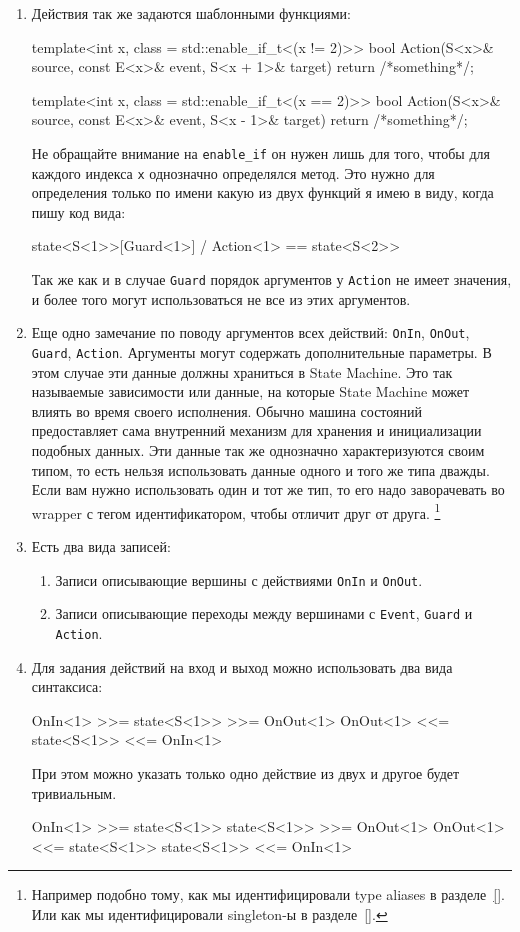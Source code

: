 \documentclass{article}
\begin{document}
{\begin{enumerate}
\item Действия так же задаются шаблонными функциями:
\begin{cppcode}[\nonumbers]
template<int x, class = std::enable_if_t<(x != 2)>>
bool Action(S<x>& source, const E<x>& event, S<x + 1>& target) {
  return /*something*/;
}

template<int x, class = std::enable_if_t<(x == 2)>>
bool Action(S<x>& source, const E<x>& event, S<x - 1>& target) {
  return /*something*/;
}
\end{cppcode}
Не обращайте внимание на \verb"enable_if" он нужен лишь для того, чтобы для каждого индекса \verb"x" однозначно определялся метод.
Это нужно для определения только по имени какую из двух функций я имею в виду, когда пишу код вида:
\begin{cppcode}[\nonumbers]
state<S<1>>[Guard<1>] / Action<1> == state<S<2>>
\end{cppcode}
Так же как и в случае \verb"Guard" порядок аргументов у \verb"Action" не имеет значения, и более того могут использоваться не все из этих аргументов.

\item Еще одно замечание по поводу аргументов всех действий: \verb"OnIn", \verb"OnOut", \verb"Guard", \verb"Action".
Аргументы могут содержать дополнительные параметры.
В этом случае эти данные должны храниться в State Machine.
Это так называемые зависимости или данные, на которые State Machine может влиять во время своего исполнения.
Обычно машина состояний предоставляет сама внутренний механизм для хранения и инициализации подобных данных.
Эти данные так же однозначно характеризуются своим типом, то есть нельзя использовать данные одного и того же типа дважды.
Если вам нужно использовать один и тот же тип, то его надо заворачевать во wrapper с тегом идентификатором, чтобы отличит друг от друга.%
\footnote{Например подобно тому, как мы идентифицировали  type aliases в разделе~\ref{}.
Или как мы идентифицировали singleton-ы в разделе~\ref{}.}

\item Есть два вида записей:
\begin{enumerate}
\item Записи описывающие вершины с действиями \verb"OnIn" и \verb"OnOut".

\item Записи описывающие переходы между вершинами с \verb"Event", \verb"Guard" и \verb"Action".
\end{enumerate}

\item Для задания действий на вход и выход можно использовать два вида синтаксиса:
\begin{cppcode}[\nonumbers]
OnIn<1> >>= state<S<1>> >>= OnOut<1>
OnOut<1> <<= state<S<1>> <<= OnIn<1>
\end{cppcode}
При этом можно указать только одно действие из двух и другое будет тривиальным.
\begin{cppcode}[\nonumbers]
OnIn<1> >>= state<S<1>>
state<S<1>> >>= OnOut<1>
OnOut<1> <<= state<S<1>>
state<S<1>> <<= OnIn<1>
\end{cppcode}


\end{enumerate}}
\end{document}
